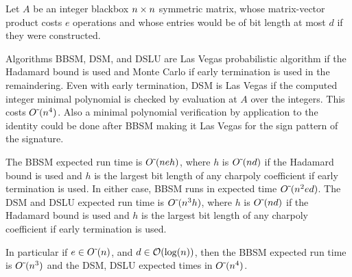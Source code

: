 \documentclass{acm_proc_article-sp}
\begin{document}
\begin{theorem}
Let $A$ be an integer blackbox $n \times n$ symmetric matrix,
whose matrix-vector product costs $e$ operations and 
whose entries would be of bit length at most $d$ if they were constructed.

Algorithms BBSM, DSM, and DSLU are Las Vegas probabilistic algorithm 
if the Hadamard bound is used and 
Monte Carlo if early termination is used in the remaindering.
Even with early termination, DSM is Las Vegas if the computed 
integer minimal polynomial is checked by evaluation at $A$ over the integers. 
This costs ${O\mskip1mu\tilde{\,}\mskip1mu}(n^4)$.%
Also a minimal polynomial verification by application to the identity 
could be done after
BBSM making it Las Vegas for the sign pattern of the signature.

The BBSM expected run time is ${O\mskip1mu\tilde{\,}\mskip1mu}(neh)$, where $h$ is ${O\mskip1mu\tilde{\,}\mskip1mu}(nd)$ 
if the Hadamard bound is used and $h$ is the largest bit length of 
any charpoly coefficient if early termination is used. 
In either case, BBSM runs in expected time ${O\mskip1mu\tilde{\,}\mskip1mu}(n^2 e d)$.
The DSM and DSLU
expected run time is ${O\mskip1mu\tilde{\,}\mskip1mu}(n^3h)$, where $h$ is ${O\mskip1mu\tilde{\,}\mskip1mu}(nd)$ if the Hadamard
bound is used and $h$ is the largest bit length of any charpoly coefficient 
if early termination is used. 

In particular if $e \in {O\mskip1mu\tilde{\,}\mskip1mu}(n)$, and $d \in \mathcal O(\log(n))$,
then the BBSM expected run time is ${O\mskip1mu\tilde{\,}\mskip1mu}(n^3)$ and the DSM, DSLU expected times in ${O\mskip1mu\tilde{\,}\mskip1mu}(n^4)$.
\end{theorem}
\end{document}
